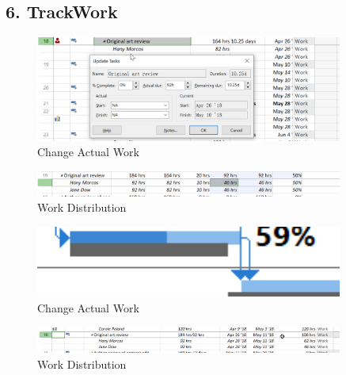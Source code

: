 \documentclass[runningheads]{llncs}
\begin{document}
\subsection*{6. TrackWork}
\begin{figure}[H]
    \centering
    \includegraphics[width=0.9\textwidth]{./image/t5f1}
    \caption{Change Actual Work}
\end{figure}
\begin{figure}[H]
    \centering
    \includegraphics[width=0.9\textwidth]{./image/t5f2}
    \caption{Work Distribution}
\end{figure}
\begin{figure}[H]
    \centering
    \includegraphics[width=0.9\textwidth]{./image/t5f3}
    \caption{Change Actual Work}
\end{figure}
\begin{figure}[H]
    \centering
    \includegraphics[width=0.9\textwidth]{./image/t5f4}
    \caption{Work Distribution}
\end{figure}
\end{document}
